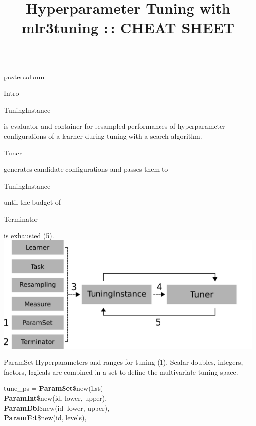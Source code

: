 \documentclass{beamer}
\title{Hyperparameter Tuning with mlr3tuning :\,: CHEAT SHEET} %
\newlength{\columnheight} %
\newcommand{\codeinline}[1]{\begin{codeboxinline}#1\end{codeboxinline}}
\begin{document}
\begin{frame}[fragile]{}
	\begin{columns}
		\begin{column}{.245\textwidth}
			\begin{beamercolorbox}[center]{postercolumn}
				\begin{minipage}{.98\textwidth}
					\parbox[t][\columnheight]{\textwidth}{
						\begin{myblock}{Intro}
							\codeinline{TuningInstance} is evaluator 
							and container for resampled performances 
							of hyperparameter configurations of a learner 
							during tuning with a search algorithm. 
                            \codeinline{Tuner} generates candidate configurations 
                            and passes them to \codeinline{TuningInstance} 
                            until the budget of \codeinline{Terminator} is exhausted (5). 
							\vspace{1em}
							\\
                            \includegraphics[width=\textwidth]{img/tuning_objects.png}
						\end{myblock}
						\begin{myblock}{ParamSet}
					        Hyperparameters and ranges for tuning (1). 
					        Scalar doubles, integers, factors, logicals are combined 
					        in a set to define the multivariate tuning space.
							\\
							\begin{codeboxmultiline}[width=20.75cm]
								tune\_ps = \textbf{ParamSet}\$new(list(\\
								\hspace*{1ex}\textbf{ParamInt}\$new(id, lower, upper),\\
								\hspace*{1ex}\textbf{ParamDbl}\$new(id, lower, upper),\\
								\hspace*{1ex}\textbf{ParamFct}\$new(id, levels),\\

\end{codeboxmultiline}
\end{myblock}}
\end{minipage}
\end{beamercolorbox}
\end{column}
\end{columns}
\end{frame}
\end{document}
